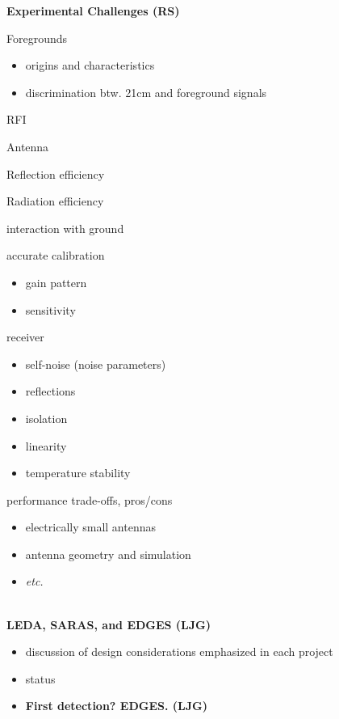 \textbf{Experimental Challenges (RS)}

Foregrounds

\begin{itemize}
\item
  origins and characteristics
\item
  discrimination btw. 21cm and foreground signals
\end{itemize}

RFI

Antenna

Reflection efficiency

Radiation efficiency

interaction with ground

accurate calibration

\begin{itemize}
\item
  gain pattern
\item
  sensitivity{~}
\end{itemize}

receiver

\begin{itemize}
\item
  self-noise (noise parameters)
\item
  reflections
\item
  isolation
\item
  linearity
\item
  temperature stability
\end{itemize}

performance trade-offs, pros/cons

\begin{itemize}
\item
  electrically small antennas
\item
  antenna geometry and simulation
\item
  \emph{etc.}
\end{itemize}

\emph{}\\

\textbf{LEDA, SARAS, and EDGES (LJG)}

\begin{itemize}
\item
  discussion of design considerations emphasized in each project
\item
  status
\end{itemize}

\begin{itemize}
\item
  \textbf{First detection? EDGES. (LJG)}
\end{itemize}

